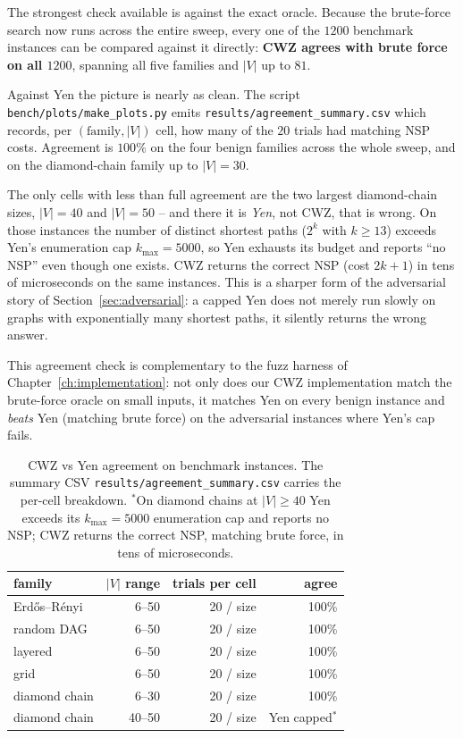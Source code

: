 The strongest check available is against the exact oracle. Because the
brute-force search now runs across the entire sweep, every one of the
$1200$ benchmark instances can be compared against it directly:
\textbf{CWZ agrees with brute force on all $1200$}, spanning all five
families and $|V|$ up to $81$.

Against Yen the picture is nearly as clean. The script
\texttt{bench/plots/make\_plots.py} emits
\texttt{results/agreement\_summary.csv} which records, per
$(\text{family},|V|)$ cell, how many of the $20$ trials had matching NSP
costs. Agreement is $100\%$ on the four benign
families across the whole sweep, and on the diamond-chain family up to
$|V|=30$.

The only cells with less than full agreement are the two largest
diamond-chain sizes, $|V|=40$ and $|V|=50$ -- and there it is
\emph{Yen}, not CWZ, that is wrong. On those instances the number of
distinct shortest paths ($2^{k}$ with $k\ge 13$) exceeds Yen's
enumeration cap $k_{\max}=5000$, so Yen exhausts its budget and reports
``no NSP'' even though one exists. CWZ returns the correct NSP (cost
$2k+1$) in tens of microseconds on the same instances. This is a sharper
form of the adversarial story of Section~\ref{sec:adversarial}: a
capped Yen does not merely run slowly on graphs with exponentially many
shortest paths, it silently returns the wrong answer.

This agreement check is complementary to the fuzz harness of
Chapter~\ref{ch:implementation}: not only does our CWZ implementation
match the brute-force oracle on small inputs, it matches Yen on every
benign instance and \emph{beats} Yen (matching brute force) on the
adversarial instances where Yen's cap fails.

\begin{table}[htbp]
  \centering
  \begin{tabular}{lrrr}
  \toprule
  family & $|V|$ range & trials per cell & agree \\
  \midrule
  Erd\H{o}s--R\'enyi & 6--50 & 20 / size & 100\% \\
  random DAG        & 6--50 & 20 / size & 100\% \\
  layered           & 6--50 & 20 / size & 100\% \\
  grid              & 6--50 & 20 / size & 100\% \\
  diamond chain     & 6--30 & 20 / size & 100\% \\
  diamond chain     & 40--50 & 20 / size & Yen capped$^{*}$ \\
  \bottomrule
  \end{tabular}
  \caption{CWZ vs Yen agreement on benchmark instances. The summary CSV
    \texttt{results/agreement\_summary.csv} carries the per-cell
    breakdown. $^{*}$On diamond chains at $|V|\ge 40$ Yen exceeds its
    $k_{\max}=5000$ enumeration cap and reports no NSP; CWZ returns the
    correct NSP, matching brute force, in tens of microseconds.}
  \label{tab:agreement}
\end{table}

